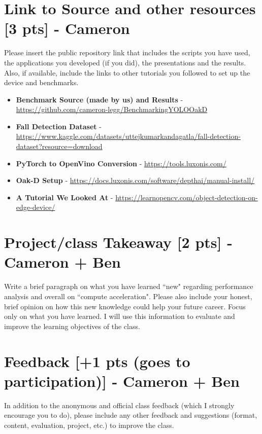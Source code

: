 \documentclass[sigconf,authorversion,nonacm]{acmart}
\begin{document}
\section{Link to Source and other resources {\small {[3 pts]}} - Cameron} 
Please insert the public repository link that includes the scripts you have used, the applications you developed (if you did), the presentations and the results. Also, if available, include the links to other tutorials you followed to set up the device and benchmarks.

\begin{itemize}
    \item \textbf{Benchmark Source (made by us) and Results} - \href{https://github.com/cameron-legg/BenchmarkingYOLOOakD}{https://github.com/cameron-legg/BenchmarkingYOLOOakD}
    \item \textbf{Fall Detection Dataset} - \href{https://www.kaggle.com/datasets/uttejkumarkandagatla/fall-detection-dataset?resource=download}{https://www.kaggle.com/datasets/uttejkumarkandagatla/fall-detection-dataset?resource=download}
    \item \textbf{PyTorch to OpenVino Conversion} - \href{https://tools.luxonis.com/}{https://tools.luxonis.com/}
    \item \textbf{Oak-D Setup} - \href{https://docs.luxonis.com/software/depthai/manual-install/}{https://docs.luxonis.com/software/depthai/manual-install/}
    \item \textbf{A Tutorial We Looked At} - \href{https://learnopencv.com/object-detection-on-edge-device/}{https://learnopencv.com/object-detection-on-edge-device/}
\end{itemize}

\section{Project/class Takeaway {\small {[2 pts]}} - Cameron + Ben}  
Write a brief paragraph on what you have learned ``new" regarding performance analysis and overall on ``compute acceleration". Please also include your honest, brief opinion on how this new knowledge could help your future career. Focus only on what you have learned. I will use this information to evaluate and improve the learning objectives of the class. 


\section{Feedback {\small {[+1 pts (goes to participation)]}} - Cameron + Ben}  
In addition to the anonymous and official class feedback (which I strongly encourage you to do), please include any other feedback and suggestions (format, content, evaluation, project, etc.) to improve the class.




\end{document}
